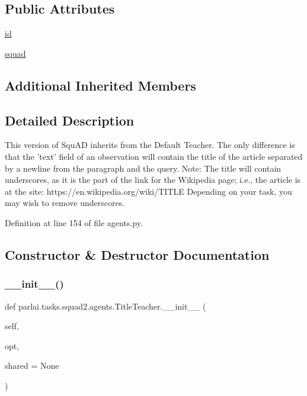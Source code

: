 \subsection*{Public Attributes}
\begin{DoxyCompactItemize}
\item 
\hyperlink{classparlai_1_1tasks_1_1squad2_1_1agents_1_1TitleTeacher_a7c29404ea09cd71791d48377d35d8e6d}{id}
\item 
\hyperlink{classparlai_1_1tasks_1_1squad2_1_1agents_1_1TitleTeacher_a192c7e24f0159dcb8c512526e7f8a1fb}{squad}
\end{DoxyCompactItemize}
\subsection*{Additional Inherited Members}


\subsection{Detailed Description}
\begin{DoxyVerb}This version of SquAD inherits from the Default Teacher. The only
difference is that the 'text' field of an observation will contain
the title of the article separated by a newline from the paragraph and the
query.
Note: The title will contain underscores, as it is the part of the link for
the Wikipedia page; i.e., the article is at the site:
https://en.wikipedia.org/wiki/{TITLE}
Depending on your task, you may wish to remove underscores.
\end{DoxyVerb}
 

Definition at line 154 of file agents.\+py.



\subsection{Constructor \& Destructor Documentation}
\mbox{\label{classparlai_1_1tasks_1_1squad2_1_1agents_1_1TitleTeacher_ad0306665ca749e4b3bb3835d81e3e26b}} 
\subsubsection{\texorpdfstring{\+\_\+\+\_\+init\+\_\+\+\_\+()}{\_\_init\_\_()}}
{\footnotesize\ttfamily def parlai.\+tasks.\+squad2.\+agents.\+Title\+Teacher.\+\_\+\+\_\+init\+\_\+\+\_\+ (\begin{DoxyParamCaption}\item[{}]{self,  }\item[{}]{opt,  }\item[{}]{shared = {\ttfamily None} }\end{DoxyParamCaption})}



